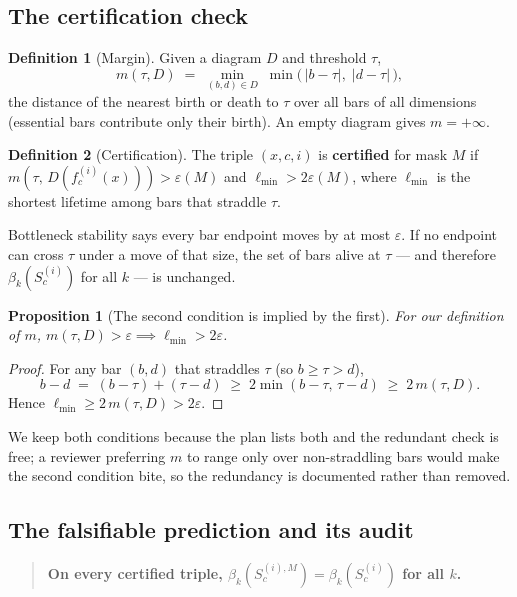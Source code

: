 \documentclass[11pt]{article}
\newcommand{\fc}{f_c^{(i)}}
\newcommand{\Betti}{\beta}
\theoremstyle{definition}
\newtheorem{definition}{Definition}
\theoremstyle{plain}
\newtheorem{proposition}{Proposition}
\begin{document}
\subsection{The certification check}

\begin{definition}[Margin]
Given a diagram $D$ and threshold $\tau$,
\[
m(\tau, D) \;=\; \min_{(b,d) \in D}\;
\min\bigl(\,|b-\tau|,\; |d-\tau|\,\bigr),
\]
the distance of the nearest birth or death to $\tau$ over all bars of all
dimensions (essential bars contribute only their birth). An empty diagram gives
$m = +\infty$.
\end{definition}

\begin{definition}[Certification]
The triple $(x, c, i)$ is \textbf{certified} for mask $M$ if
$m\!\left(\tau,\, D(\fc(x))\right) > \varepsilon(M)$ and
$\ell_{\min} > 2\varepsilon(M)$, where $\ell_{\min}$ is the shortest lifetime
among bars that straddle $\tau$.
\end{definition}

Bottleneck stability  says every bar endpoint moves by at most
$\varepsilon$. If no endpoint can cross $\tau$ under a move of that size, the set
of bars alive at $\tau$ --- and therefore $\Betti_k(S_c^{(i)})$ for all $k$ ---
is unchanged.

\begin{proposition}[The second condition is implied by the first]
\label{prop:redundant}
For our definition of $m$, $m(\tau,D) > \varepsilon \implies \ell_{\min} >
2\varepsilon$.
\end{proposition}
\begin{proof}
For any bar $(b,d)$ that straddles $\tau$ (so $b \ge \tau > d$),
\[
b - d \;=\; (b - \tau) + (\tau - d) \;\ge\; 2\min(b-\tau,\, \tau-d) \;\ge\;
2\, m(\tau, D).
\]
Hence $\ell_{\min} \ge 2\,m(\tau,D) > 2\varepsilon$.
\end{proof}

We keep both conditions because the plan lists both and the redundant check is
free; a reviewer preferring $m$ to range only over non-straddling bars would make
the second condition bite, so the redundancy is documented rather than removed.

\subsection{The falsifiable prediction and its audit}

\begin{quote}
\textbf{On every certified triple, $\Betti_k(S_c^{(i),M}) = \Betti_k(S_c^{(i)})$
for all $k$.}
\end{quote}
\end{document}

